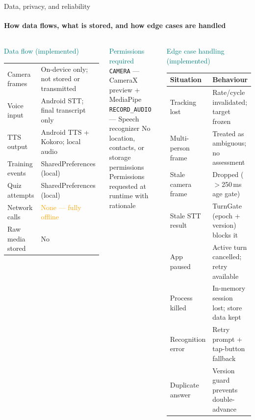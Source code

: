 \documentclass[aspectratio=169,t]{beamer}
\newcommand{\teal}[1]{\textcolor{Teal}{#1}}
\newcommand{\orange}[1]{\textcolor{Orange}{#1}}
\begin{document}
\begin{frame}{Data, privacy, and reliability}
\framesubtitle{How data flows, what is stored, and how edge cases are handled}

\begin{columns}[T]
  \begin{block}{\teal{Data flow (implemented)}}
    \footnotesize
    \begin{tabular}{@{}ll@{}}
      Camera frames     & On-device only; not stored or transmitted \\
      Voice input       & Android STT; final transcript only \\
      TTS output        & Android TTS + Kokoro; local audio \\
      Training events   & SharedPreferences (local) \\
      Quiz attempts     & SharedPreferences (local) \\
      Network calls     & \orange{None — fully offline} \\
      Raw media stored  & No \\
    \end{tabular}
  \end{block}
  \vspace{0.25cm}
  \begin{block}{\teal{Permissions required}}
    \footnotesize
    \texttt{CAMERA} — CameraX preview + MediaPipe\newline
    \texttt{RECORD\_AUDIO} — Speech recognizer\newline
    No location, contacts, or storage permissions\newline
    Permissions requested at runtime with rationale
  \end{block}

  \begin{block}{\teal{Edge case handling (implemented)}}
    \footnotesize
    \begin{tabular}{@{}p{2.8cm}p{3.0cm}@{}}
      \textbf{Situation} & \textbf{Behaviour} \\
      \midrule
      Tracking lost      & Rate/cycle invalidated; target frozen \\
      Multi-person frame & Treated as ambiguous; no assessment \\
      Stale camera frame & Dropped ($>$250\,ms age gate) \\
      Stale STT result   & TurnGate (epoch + version) blocks it \\
      App paused         & Active turn cancelled; retry available \\
      Process killed     & In-memory session lost; store data kept \\
      Recognition error  & Retry prompt + tap-button fallback \\
      Duplicate answer   & Version guard prevents double-advance \\
    \end{tabular}
  \end{block}


\end{columns}
\end{frame}
\end{document}
